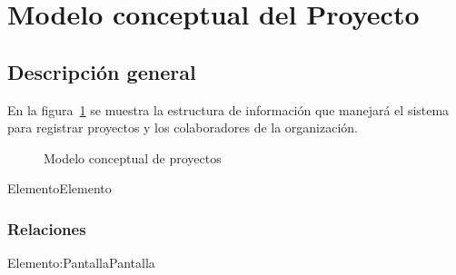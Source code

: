 \section{Modelo conceptual del Proyecto}
\subsection{Descripción general}
 En la figura~\ref{fig:modeloConceptualProyectos} se muestra la estructura de información que manejará el sistema para registrar proyectos 
 y los colaboradores de la organización.
 
\begin{figure}[htbp!]
	\begin{center}
		\caption{Modelo conceptual de proyectos}
		\label{fig:modeloConceptualProyectos}
	\end{center}
\end{figure}


\clearpage
\begin{BusinessEntity}{Elemento}{Elemento}
\end{BusinessEntity}

\subsubsection{Relaciones}

\begin{BusinessFact}{Elemento:Pantalla}{Pantalla}
\end{BusinessFact}

